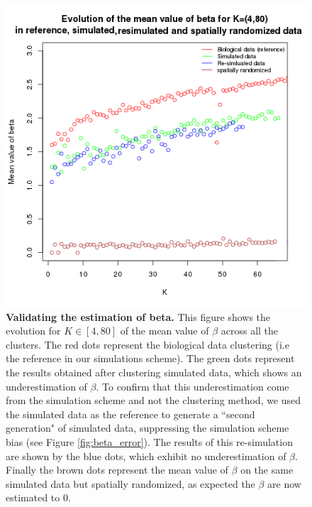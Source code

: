 	\begin{figure}[h]
\centerline{\includegraphics[width=\linewidth]{gfx/chapter5/beta_valid.png}}
\caption{{\bf Validating the estimation of beta.} This figure shows the evolution for $K \in [4,80]$ of the mean value of $\beta$ across all the clusters. The red dots represent the biological data clustering (i.e the reference in our simulations scheme). The green dots represent the results obtained after clustering simulated data, which shows an underestimation of $\beta$. To confirm that this underestimation come from the simulation scheme and not the clustering method, we used the simulated data as the reference to generate a ``second generation" of simulated data, suppressing the simulation scheme bias (see Figure \ref{fig:beta_error}). The results of this re-simulation are shown by the blue dots, which exhibit no underestimation of $\beta$. Finally the brown dots represent the mean value of $\beta$ on the same simulated data but spatially randomized, as expected the $\beta$ are now estimated to $0$.}
\label{fig:beta_validation}
	\end{figure}
	
